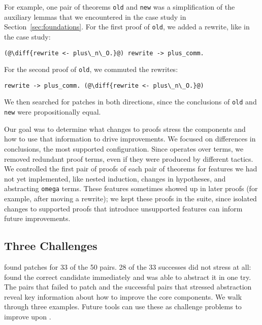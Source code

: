 For example, one pair of theorems \lstinline{old} and \lstinline{new} was a 
simplification of the auxiliary lemmas
that we encountered in the case study in Section~\ref{sec:foundations}.
For the first proof of \lstinline{old}, we added a rewrite, like in the case study:

\begin{lstlisting}[language=coq]
    (@\diff{rewrite <- plus\_n\_O.}@) rewrite -> plus_comm.
\end{lstlisting}

For the second proof of \lstinline{old}, we commuted the rewrites:

\begin{lstlisting}[language=coq]
    rewrite -> plus_comm. (@\diff{rewrite <- plus\_n\_O.}@)
\end{lstlisting} 

We then searched for patches in both directions,
since the conclusions of \lstinline{old}
and \lstinline{new} were propositionally equal.

Our goal was to determine what changes to proofs stress the components
and how to use that information to drive improvements.
We focused on differences in conclusions, the most supported configuration.
Since \sysname operates over terms,
we removed redundant proof terms, even if they were produced by different tactics.
We controlled the first pair of proofs of each pair of theorems for features we had not yet implemented,
like nested induction, changes in hypotheses, and abstracting \lstinline{omega} terms.
These features sometimes showed up in later proofs (for example, after moving a rewrite);
we kept these proofs in the suite, since isolated changes to supported proofs that
introduce unsupported features can inform future improvements.	

\subsection{Three Challenges}
\label{sec:fail}

\sysname found patches for 33 of the 50 pairs. 28 of the 33 successes
did not stress \sysname at all: \sysname found the correct candidate immediately and was able to abstract it
in one try.
The pairs that \sysname failed to patch and the successful pairs that stressed abstraction
reveal key information about how to improve the core components.
We walk through three examples.
Future tools can use these as challenge problems to improve upon \sysname.

